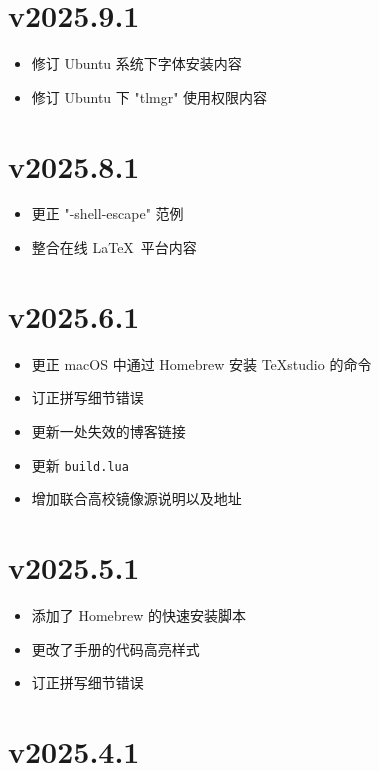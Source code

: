 \section*{v2025.9.1}

\begin{itemize}
  \item 修订 Ubuntu 系统下字体安装内容
  \item 修订 Ubuntu 下 "tlmgr" 使用权限内容
\end{itemize}

\section*{v2025.8.1}

\begin{itemize}
  \item 更正 "-shell-escape" 范例
  \item 整合在线 \LaTeX\ 平台内容
\end{itemize}

\section*{v2025.6.1}

\begin{itemize}
  \item 更正 macOS 中通过 Homebrew 安装 \TeX studio 的命令
  \item 订正拼写细节错误
  \item 更新一处失效的博客链接
  \item 更新 \texttt{build.lua}
  \item 增加联合高校镜像源说明以及地址
\end{itemize}

\section*{v2025.5.1}

\begin{itemize}
  \item 添加了 Homebrew 的快速安装脚本
  \item 更改了手册的代码高亮样式
  \item 订正拼写细节错误
\end{itemize}

\section*{v2025.4.1}

